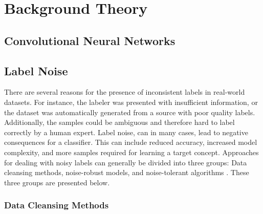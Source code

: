 \section{Background Theory}
\label{sec:background_theory}
\subsection{Convolutional Neural Networks}

\label{sec:convolutional_networks_background}

\subsection{Label Noise}
\label{sec:background_label_noise}
There are several reasons for the presence of inconsistent labels in real-world datasets. For instance, the labeler was presented with insufficient information, or the dataset was automatically generated from a source with poor quality labels. Additionally, the samples could be ambiguous and therefore hard to label correctly by a human expert. Label noise, can in many cases, lead to negative consequences for a classifier. This can include reduced accuracy, increased model complexity, and more samples required for learning a target concept. Approaches for dealing with noisy labels can generally be divided into three groups: Data cleansing methods, noise-robust models, and noise-tolerant algorithms \citep{Frenay_label_noise_survey}. These three groups are presented below.  \\






\subsubsection{Data Cleansing Methods}

